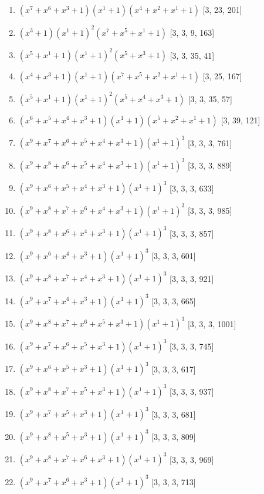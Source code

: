 \documentclass[10pt,twocolumn]{article}
\begin{document}
\begin{enumerate}
\item $(x^{7} + x^{6} + x^{3} + 1)(x^{1} + 1)(x^{4} + x^{2} + x^{1} + 1)$  [3, 23, 201]
\item $(x^{3} + 1)(x^{1} + 1)^{2}(x^{7} + x^{5} + x^{1} + 1)$  [3, 3, 9, 163]
\item $(x^{5} + x^{1} + 1)(x^{1} + 1)^{2}(x^{5} + x^{3} + 1)$  [3, 3, 35, 41]
\item $(x^{4} + x^{3} + 1)(x^{1} + 1)(x^{7} + x^{5} + x^{2} + x^{1} + 1)$  [3, 25, 167]
\item $(x^{5} + x^{1} + 1)(x^{1} + 1)^{2}(x^{5} + x^{4} + x^{3} + 1)$  [3, 3, 35, 57]
\item $(x^{6} + x^{5} + x^{4} + x^{3} + 1)(x^{1} + 1)(x^{5} + x^{2} + x^{1} + 1)$  [3, 39, 121]
\item $(x^{9} + x^{7} + x^{6} + x^{5} + x^{4} + x^{3} + 1)(x^{1} + 1)^{3}$  [3, 3, 3, 761]
\item $(x^{9} + x^{8} + x^{6} + x^{5} + x^{4} + x^{3} + 1)(x^{1} + 1)^{3}$  [3, 3, 3, 889]
\item $(x^{9} + x^{6} + x^{5} + x^{4} + x^{3} + 1)(x^{1} + 1)^{3}$  [3, 3, 3, 633]
\item $(x^{9} + x^{8} + x^{7} + x^{6} + x^{4} + x^{3} + 1)(x^{1} + 1)^{3}$  [3, 3, 3, 985]
\item $(x^{9} + x^{8} + x^{6} + x^{4} + x^{3} + 1)(x^{1} + 1)^{3}$  [3, 3, 3, 857]
\item $(x^{9} + x^{6} + x^{4} + x^{3} + 1)(x^{1} + 1)^{3}$  [3, 3, 3, 601]
\item $(x^{9} + x^{8} + x^{7} + x^{4} + x^{3} + 1)(x^{1} + 1)^{3}$  [3, 3, 3, 921]
\item $(x^{9} + x^{7} + x^{4} + x^{3} + 1)(x^{1} + 1)^{3}$  [3, 3, 3, 665]
\item $(x^{9} + x^{8} + x^{7} + x^{6} + x^{5} + x^{3} + 1)(x^{1} + 1)^{3}$  [3, 3, 3, 1001]
\item $(x^{9} + x^{7} + x^{6} + x^{5} + x^{3} + 1)(x^{1} + 1)^{3}$  [3, 3, 3, 745]
\item $(x^{9} + x^{6} + x^{5} + x^{3} + 1)(x^{1} + 1)^{3}$  [3, 3, 3, 617]
\item $(x^{9} + x^{8} + x^{7} + x^{5} + x^{3} + 1)(x^{1} + 1)^{3}$  [3, 3, 3, 937]
\item $(x^{9} + x^{7} + x^{5} + x^{3} + 1)(x^{1} + 1)^{3}$  [3, 3, 3, 681]
\item $(x^{9} + x^{8} + x^{5} + x^{3} + 1)(x^{1} + 1)^{3}$  [3, 3, 3, 809]
\item $(x^{9} + x^{8} + x^{7} + x^{6} + x^{3} + 1)(x^{1} + 1)^{3}$  [3, 3, 3, 969]
\item $(x^{9} + x^{7} + x^{6} + x^{3} + 1)(x^{1} + 1)^{3}$  [3, 3, 3, 713]

\end{enumerate}
\end{document}

